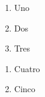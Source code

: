 \documentclass[a4,10pt]{aleph-notas}
\begin{document}
\begin{enumerate}[series = ejercicios]
    \item 
        Uno
    \item
        Dos
    \item
        Tres
\end{enumerate}

\begin{enumerate}[resume* = ejercicios]
    \item 
        Cuatro
    \item
        Cinco
\end{enumerate}
\end{document}
